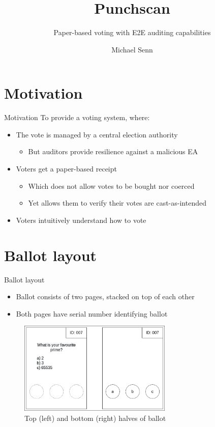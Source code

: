 \documentclass{beamer}
\title{Punchscan}
\subtitle{Paper-based voting with E2E auditing capabilities}
\author{Michael Senn}
\institute{Faculty of Science, University of Bern}
\date{\DTMusedate{presentation}}
\begin{document}
\maketitle

\section{Motivation}

\begin{frame}{Motivation}
	To provide a voting system, where:
	\begin{itemize}
		\item The vote is managed by a central election authority
			\begin{itemize}
				\item But auditors provide resilience against a malicious EA
			\end{itemize}
		\item Voters get a paper-based receipt
			\begin{itemize}
				\item Which does not allow votes to be bought nor coerced
				\item Yet allows them to verify their votes are cast-as-intended
			\end{itemize}
		\item Voters intuitively understand how to vote
	\end{itemize}
\end{frame}

\section{Ballot layout}

\begin{frame}{Ballot layout}
	\begin{itemize}
		\item Ballot consists of two pages, stacked on top of each other
		\item Both pages have serial number identifying ballot
	\end{itemize}
	\begin{figure}
		\centering
		\includegraphics[width=0.65\textwidth]{../resources/high_level_ballot.drawio.png}
		\caption{Top (left) and bottom (right) halves of ballot}
	\end{figure}
\end{frame}
\end{document}
